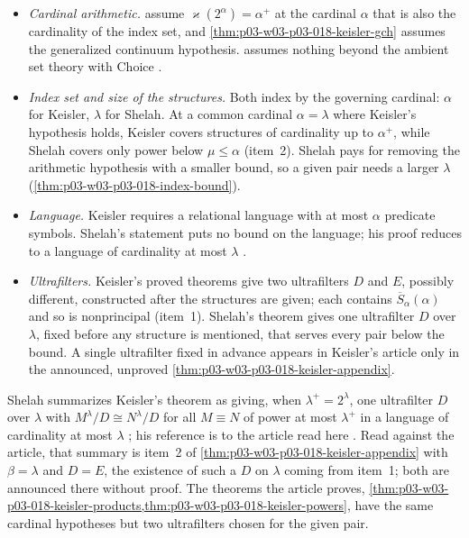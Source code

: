 \begin{itemize}
  \item \emph{Cardinal arithmetic.}
        assume \(\varkappa(2^\alpha)=\alpha^+\) at the cardinal \(\alpha\)
        that is also the cardinality of the index set, and
        \cref{thm:p03-w03-p03-018-keisler-gch} assumes the generalized
        continuum hypothesis.   assumes
        nothing beyond the ambient set theory with Choice
        \cite[224]{Shelah1971Ultrapowers}.
  \item \emph{Index set and size of the structures.}  Both index by the
        governing cardinal: \(\alpha\) for Keisler, \(\lambda\) for Shelah.
        At a common cardinal \(\alpha=\lambda\) where Keisler's hypothesis
        holds, Keisler covers structures of cardinality up to \(\alpha^+\),
        while Shelah covers only power below \(\mu\le\alpha\) (item~2).
        Shelah pays for removing the arithmetic hypothesis with a smaller
        bound, so a given pair needs a larger \(\lambda\)
        (\cref{thm:p03-w03-p03-018-index-bound}).
  \item \emph{Language.}  Keisler requires a relational language with at most
        \(\alpha\) predicate symbols.  Shelah's statement puts no bound on the
        language; his proof reduces to a language of cardinality at most
        \(\lambda\) \cite[230]{Shelah1971Ultrapowers}.
  \item \emph{Ultrafilters.}  Keisler's proved theorems give two ultrafilters
        \(D\) and \(E\), possibly different, constructed after the structures
        are given; each contains \(\overline S_\alpha(\alpha)\) and so is
        nonprincipal (item~1).  Shelah's theorem gives one ultrafilter \(D\)
        over \(\lambda\), fixed before any structure is mentioned, that serves
        every pair below the bound.  A single ultrafilter fixed in advance
        appears in Keisler's article only in the announced, unproved
        \cref{thm:p03-w03-p03-018-keisler-appendix}.
\end{itemize}

Shelah summarizes Keisler's theorem as giving, when \(\lambda^+=2^\lambda\),
one ultrafilter \(D\) over \(\lambda\) with
\(M^\lambda/D\cong N^\lambda/D\) for all \(M\equiv N\) of power at most
\(\lambda^+\) in a language of cardinality at most \(\lambda\)
\cite[224]{Shelah1971Ultrapowers}; his reference is to the article read here
\cite[232]{Shelah1971Ultrapowers}.  Read against the article, that summary is
item~2 of \cref{thm:p03-w03-p03-018-keisler-appendix} with \(\beta=\lambda\)
and \(D=E\), the existence of such a \(D\) on \(\lambda\) coming from item~1;
both are announced there without proof.  The theorems the article proves,
\cref{thm:p03-w03-p03-018-keisler-products,thm:p03-w03-p03-018-keisler-powers},
have the same cardinal hypotheses but two ultrafilters chosen for the given
pair.

